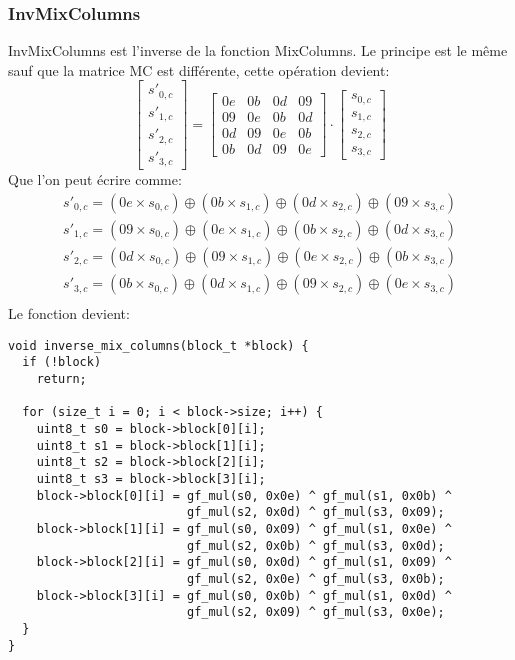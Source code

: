 \documentclass[a4paper, 10pt]{article}
\begin{document}
\subsubsection{InvMixColumns}
  InvMixColumns est l’inverse de la fonction MixColumns. Le principe est le 
  même sauf que la matrice MC est différente, cette opération devient:
\[
    \begin{bmatrix}
      s'_{0,c}\\
      s'_{1,c}\\
      s'_{2,c}\\
      s'_{3,c}
    \end{bmatrix}
    =
    \begin{bmatrix}
      0e&0b&0d&09\\
      09&0e&0b&0d\\
      0d&09&0e&0b\\
      0b&0d&09&0e
    \end{bmatrix}
    \cdot 
    \begin{bmatrix}
      s_{0,c}\\
      s_{1,c}\\
      s_{2,c}\\
      s_{3,c}
    \end{bmatrix}
  \]
  Que l’on peut écrire comme:
  \begin{align*}
    s'_{0,c} = ({0e} \times s_{0,c}) \oplus ({0b} \times s_{1,c}) \oplus ({0d} \times s_{2,c}) \oplus ({09} \times s_{3,c}) \\
    s'_{1,c} = ({09} \times s_{0,c}) \oplus ({0e} \times s_{1,c}) \oplus ({0b} \times s_{2,c}) \oplus ({0d} \times s_{3,c}) \\
    s'_{2,c} = ({0d} \times s_{0,c}) \oplus ({09} \times s_{1,c}) \oplus ({0e} \times s_{2,c}) \oplus ({0b} \times s_{3,c}) \\
    s'_{3,c} = ({0b} \times s_{0,c}) \oplus ({0d} \times s_{1,c}) \oplus ({09} \times s_{2,c}) \oplus ({0e} \times s_{3,c}) \\
  \end{align*}
  Le fonction devient:
  \small{
    \begin{verbatim}
void inverse_mix_columns(block_t *block) {
  if (!block)
    return;

  for (size_t i = 0; i < block->size; i++) {
    uint8_t s0 = block->block[0][i];
    uint8_t s1 = block->block[1][i];
    uint8_t s2 = block->block[2][i];
    uint8_t s3 = block->block[3][i];
    block->block[0][i] = gf_mul(s0, 0x0e) ^ gf_mul(s1, 0x0b) ^
                         gf_mul(s2, 0x0d) ^ gf_mul(s3, 0x09);
    block->block[1][i] = gf_mul(s0, 0x09) ^ gf_mul(s1, 0x0e) ^
                         gf_mul(s2, 0x0b) ^ gf_mul(s3, 0x0d);
    block->block[2][i] = gf_mul(s0, 0x0d) ^ gf_mul(s1, 0x09) ^
                         gf_mul(s2, 0x0e) ^ gf_mul(s3, 0x0b);
    block->block[3][i] = gf_mul(s0, 0x0b) ^ gf_mul(s1, 0x0d) ^
                         gf_mul(s2, 0x09) ^ gf_mul(s3, 0x0e);
  }
}
    \end{verbatim}
  }
\end{document}

